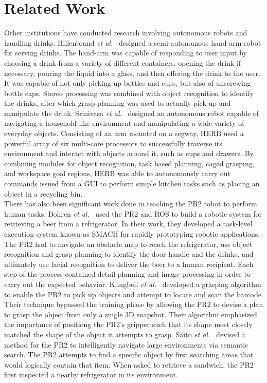 \documentclass{sig-alternate}
\begin{document}
\section{Related Work}
\label{sec:related_work}
Other institutions have conducted research involving autonomous robots and handling drinks. Hillenbrand \textit{et al.}~\cite{pouring_arm} designed a semi-autonomous hand-arm robot for serving drinks. The hand-arm was capable of responding to user input by choosing a drink from a variety of different containers, opening the drink if necessary, pouring the liquid into a glass, and then offering the drink to the user. It was capable of not only picking up bottles and cups, but also of unscrewing bottle caps. Stereo processing was combined with object recognition to identify the drinks, after which grasp planning was used to actually pick up and manipulate the drink. Srinivasa \textit{et al.}~\cite{herb} designed an autonomous robot capable of navigating a household-like environment and manipulating a wide variety of everyday objects. Consisting of an arm mounted on a segway, HERB used a powerful array of six multi-core processors to successfully traverse its environment and interact with objects around it, such as cups and drawers. By combining modules for object recognition, task based planning, caged grasping, and workspace goal regions, HERB was able to autonomously carry out commands issued from a GUI to perform simple kitchen tasks such as placing an object in a recycling bin.\\
There has also been significant work done in teaching the PR2 robot to perform human tasks. Bohren \textit{et al.}~\cite{beer} used the PR2 and ROS to build a robotic system for retrieving a beer from a refrigerator. In their work, they developed a task-level execution system known as SMACH for rapidly prototyping robotic applications. The PR2 had to navigate an obstacle map to reach the refrigerator, use object recognition and grasp planning to identify the door handle and the drinks, and ultimately use facial recognition to deliver the beer to a human recipient. Each step of the process contained detail planning and image processing in order to carry out the expected behavior. Klingbeil \textit{et al.}~\cite{groceries} developed a grasping algorithm to enable the PR2 to pick up objects and attempt to locate and scan the barcode. Their technique bypassed the training phase by allowing the PR2 to devise a plan to grasp the object from only a single 3D snapshot. Their algorithm emphasized the importance of positiong the PR2's gripper such that its shape most closely matched the shape of the object it attempts to grasp. Saito \textit{et al.}~\cite{subway} devised a method for the PR2 to intelligently navigate large environments via semantic search. The PR2 attempts to find a specific object by first searching areas that would logically contain that item. When asked to retrieve a sandwich, the PR2 first inspected a nearby refrigerator in its environment.\\ 
\end{document}
